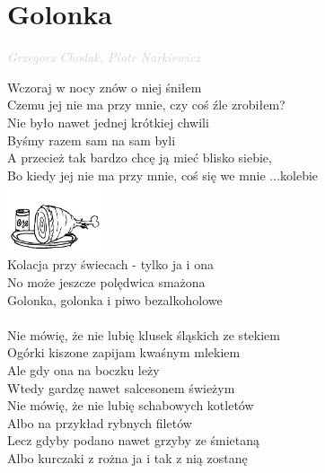 \documentclass[a5paper, 10pt]{book}
\begin{document}
\section{Golonka}\textcolor{lightgray}{\textit{Grzegorz Chodak, Piotr Narkiewicz}}\vspace*{2mm}\\
\begin{minipage}[t]{0.77\textwidth}
  Wczoraj w nocy znów o niej śniłem\\
  Czemu jej nie ma przy mnie, czy coś źle zrobiłem?\\
  Nie było nawet jednej krótkiej chwili\\
  Byśmy razem sam na sam byli\vspace*{2mm}
  \\
  A przecież tak bardzo chcę ją mieć blisko siebie,\\
  Bo kiedy jej nie ma przy mnie, coś się we mnie ...kolebie\\
  \includegraphics[height=20mm,right]{images/golonka.png}\vspace*{-21mm}\\
  Kolacja przy świecach - tylko ja i ona\\
  No może jeszcze polędwica smażona\\

  \hspace*{5mm}Golonka, golonka i piwo bezalkoholowe\\
  \\
  Nie mówię, że nie lubię klusek śląskich ze stekiem\\
  Ogórki kiszone zapijam kwaśnym mlekiem\\
  Ale gdy ona na boczku leży\\
  Wtedy gardzę nawet salcesonem świeżym\vspace*{2mm}
  \\
  Nie mówię, że nie lubię schabowych kotletów\\
  Albo na przykład rybnych filetów\\
  Lecz gdyby podano nawet grzyby ze śmietaną\\
  Albo kurczaki z rożna ja i tak z nią zostanę\\
\end{minipage}
\end{document}
